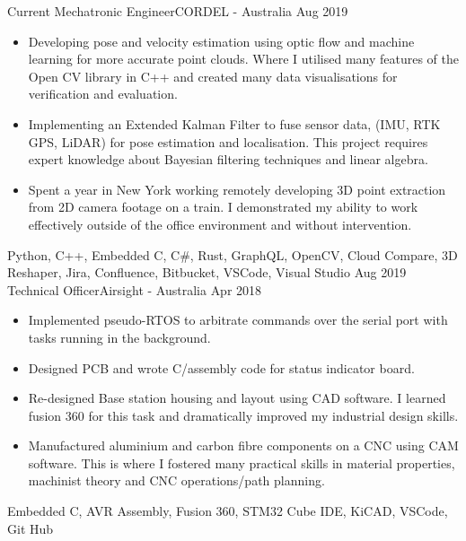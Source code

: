 %
%
%
\begin{experiences}
	\experience
		{Current}	{Mechatronic Engineer}{CORDEL - Australia}
		{Aug 2019}	{
			\begin{itemize}
				\item Developing pose and velocity estimation using optic flow and machine learning for more accurate point clouds. Where I utilised many features of the Open CV library in C++ and created many data visualisations for verification and evaluation.
				\item Implementing an Extended Kalman Filter to fuse sensor data, (IMU, RTK GPS, LiDAR) for pose estimation and localisation. This project requires expert knowledge about Bayesian filtering techniques and linear algebra.
				\item Spent a year in New York working remotely developing 3D point extraction from 2D camera footage on a train. I demonstrated my ability to work effectively outside of the office environment and without intervention.
			\end{itemize}
		}
		{Python, C++, Embedded C, C\#, Rust, GraphQL, OpenCV, Cloud Compare, 3D Reshaper, Jira, Confluence, Bitbucket, VSCode, Visual Studio}
	\emptySeparator
	\experience
		{Aug 2019}	{Technical Officer}{Airsight - Australia}
		{Apr 2018}	{
			\begin{itemize}
				\item Implemented pseudo-RTOS to arbitrate commands over the serial port with tasks running in the background.
				\item Designed PCB and wrote C/assembly code for status indicator board.
				\item Re-designed Base station housing and layout using CAD software. I learned fusion 360 for this task and dramatically improved my industrial design skills.
				\item Manufactured aluminium and carbon fibre components on a CNC using CAM software. This is where I fostered many practical skills in material properties, machinist theory and CNC operations/path planning.
			\end{itemize}
		}
		{Embedded C, AVR Assembly, Fusion 360, STM32 Cube IDE, KiCAD, VSCode, Git Hub}

\end{experiences}
